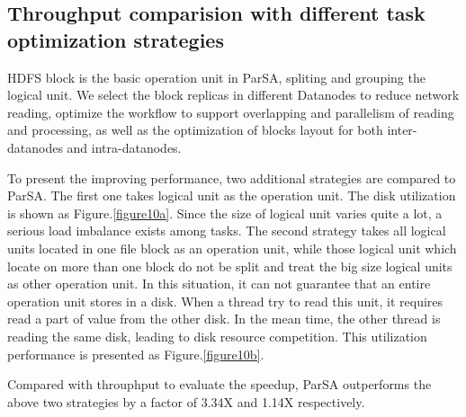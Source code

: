\documentclass[preprint,12pt]{elsarticle}
\begin{document}
\subsection{Throughput comparision with different task optimization strategies}
HDFS block is the basic operation unit in ParSA, spliting and grouping the logical unit. We select the block replicas in different 
Datanodes to reduce network reading, optimize the workflow to support overlapping and parallelism of reading and processing, as well as 
the optimization of blocks layout for both inter-datanodes and intra-datanodes. \par
To present the improving performance, two additional strategies are compared to ParSA. The first one takes logical unit as the operation
unit. The disk utilization is shown as Figure.\ref{figure10a}. Since the size of logical unit varies quite a lot, a serious load imbalance
exists among tasks. The second strategy takes all logical units located in one file block as an operation unit, while those logical unit 
which locate on more than one block do not be split and treat the big size logical units as other operation unit. In this situation, it can
not guarantee that an entire operation unit stores in a disk. When a thread try to read this unit, it requires read a part of value from the
other disk. In the mean time, the other thread is reading the same disk, leading to disk resource competition. This utilization performance
is presented as Figure.\ref{figure10b}. \par
Compared with throuphput to evaluate the speedup, ParSA outperforms the above two strategies by a factor of 3.34X and 1.14X respectively.
\end{document}
